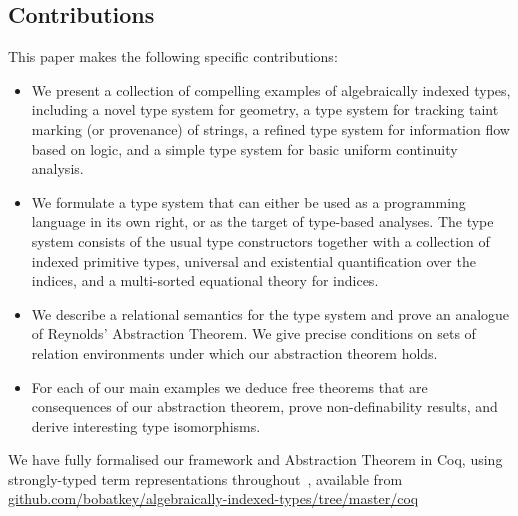 
\subsection{Contributions}
\label{sec:contributions}

This paper makes the following specific contributions:
\begin{itemize}
\item 
We present a collection of compelling examples of algebraically
indexed types, including a novel type system for geometry, a type
system for tracking taint marking (or provenance) of strings, a
refined type system for information flow based on logic, and a simple
type system for basic uniform continuity analysis.
\item 
We formulate a type system that can either be used as a programming
language in its own right, or as the target of type-based
analyses. The type system consists of the usual type constructors
together with a collection of indexed primitive types, universal and
existential quantification over the indices, and a multi-sorted
equational theory for indices.
\item
We describe a relational semantics for the type system and prove an
analogue of Reynolds' Abstraction Theorem. We give precise conditions
on sets of relation environments under which our abstraction theorem
holds.
\item
For each of our main examples we deduce free theorems that are
consequences of our abstraction theorem, prove non-definability
results, and derive interesting type isomorphisms.
\end{itemize}
We have fully formalised our framework and Abstraction Theorem in Coq,
using strongly-typed term representations
throughout~\cite{TypedSyntax}, available from
\\\url{github.com/bobatkey/algebraically-indexed-types/tree/master/coq}



